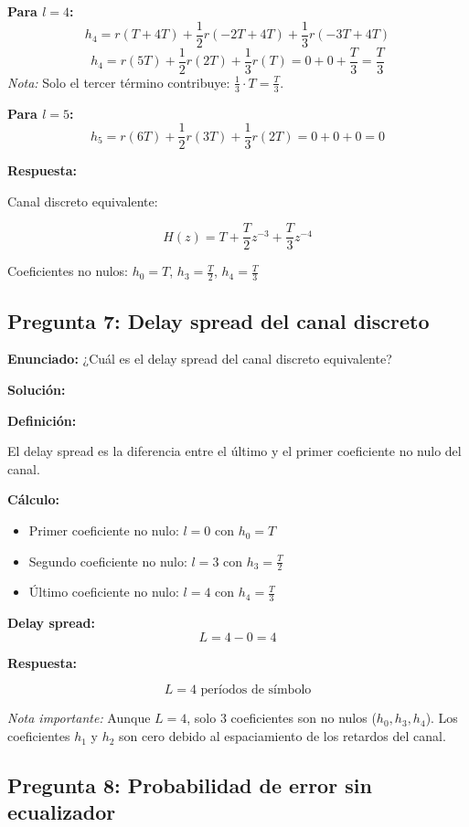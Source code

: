 \documentclass[11pt,a4paper]{article}
\begin{document}
\textbf{Para $l = 4$:}
\[
h_4 = r(T + 4T) + \frac{1}{2}r(-2T + 4T) + \frac{1}{3}r(-3T + 4T)
\]
\[
h_4 = r(5T) + \frac{1}{2}r(2T) + \frac{1}{3}r(T) = 0 + 0 + \frac{T}{3} = \frac{T}{3}
\]
\textit{Nota:} Solo el tercer término contribuye: $\frac{1}{3} \cdot T = \frac{T}{3}$.

\textbf{Para $l = 5$:}
\[
h_5 = r(6T) + \frac{1}{2}r(3T) + \frac{1}{3}r(2T) = 0 + 0 + 0 = 0
\]

\textbf{Respuesta:}

Canal discreto equivalente:

\[
\boxed{H(z) = T + \frac{T}{2}z^{-3} + \frac{T}{3}z^{-4}}
\]

Coeficientes no nulos: $h_0 = T$, $h_3 = \frac{T}{2}$, $h_4 = \frac{T}{3}$

\subsection*{Pregunta 7: Delay spread del canal discreto}

\textbf{Enunciado:} ¿Cu\'al es el delay spread del canal discreto equivalente?

\vspace{0.3cm}
\textbf{Soluci\'on:}

\textbf{Definici\'on:}

El delay spread es la diferencia entre el \'ultimo y el primer coeficiente no nulo del canal.

\textbf{C\'alculo:}

\begin{itemize}
    \item Primer coeficiente no nulo: $l = 0$ con $h_0 = T$
    \item Segundo coeficiente no nulo: $l = 3$ con $h_3 = \frac{T}{2}$
    \item \'Ultimo coeficiente no nulo: $l = 4$ con $h_4 = \frac{T}{3}$
\end{itemize}

\textbf{Delay spread:}
\[
L = 4 - 0 = 4
\]

\textbf{Respuesta:}

\[
\boxed{L = 4 \text{ per\'iodos de s\'imbolo}}
\]

\textit{Nota importante:} Aunque $L=4$, solo 3 coeficientes son no nulos ($h_0, h_3, h_4$). Los coeficientes $h_1$ y $h_2$ son cero debido al espaciamiento de los retardos del canal.

\subsection*{Pregunta 8: Probabilidad de error sin ecualizador}
\end{document}
